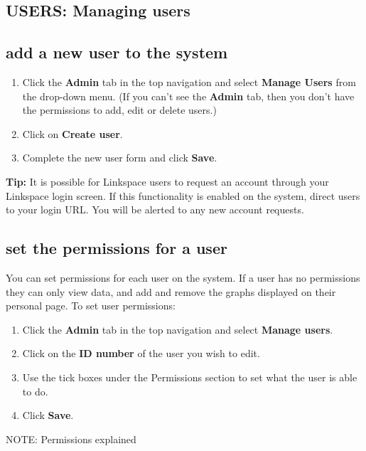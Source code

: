 \documentclass{ctrlo-int-toc}
\begin{document}
\begin{admin}
\clearpage\section[USERS: Managing users ]{USERS: Managing users }
\subsection[add a new user to the system ]{add a new user to the system }
\begin{enumerate}
\item Click the \textbf{Admin} tab in the top navigation and select \textbf{Manage Users} from the drop-down menu. (If you can't see the \textbf{Admin} tab, then you don't have the permissions to add, edit or delete users.)
\item Click on \textbf{Create user}.
\item Complete the new user form and click \textbf{Save}.
\end{enumerate}
\begin{tipbox}[userdefinedwidth=15cm]
\textbf{Tip:} It is possible for Linkspace users to request an account through your Linkspace login screen. If this functionality is enabled on the system, direct users to your login URL. You will be alerted to any new account requests. \
\end{tipbox}

\bigskip

\subsection[set the permissions for a user]{set the permissions for a user}
\label{subsec:userperms}
You can set permissions for each user on the system. If a user has no permissions they can only view data, and add and remove the graphs displayed on their personal page. To set user permissions:
\begin{enumerate}
    \item Click the \textbf{Admin} tab in the top navigation and select \textbf{Manage users}.
    \item Click on the \textbf{ID number} of the user you wish to edit.
    \item Use the tick boxes under the Permissions section to set what the user is able to do.
    \item Click \textbf{Save}.
\end{enumerate}

\begin{notebox}
    NOTE: Permissions explained
\end{notebox}


\end{admin}
\end{document}
